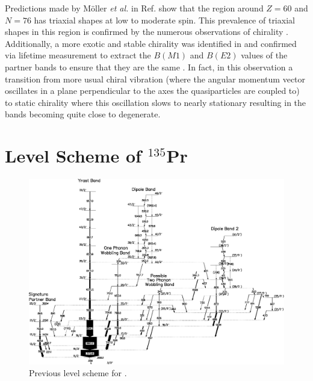 Predictions made by M\"oller \emph{et al.} in Ref. \cite{groundStateTriax} show that the region around $Z=60$ and $N=76$ has triaxial shapes at low to moderate spin. This prevalence of triaxial shapes in this region is confirmed by the numerous observations of chirality \cite{wobblingIn134Pr,chiralityA130Region,chiralityA130Region2,chiralityUpperA130Region,chirality136Pm,chiralityMore135Nd,chiralityMulti133Cs,chiralityMore135Nd}. Additionally, a more exotic and stable chirality was identified in \cite{chiralityMore135Nd} and confirmed via lifetime measurement to extract the $B(M1)$ and $B(E2)$ values of the partner bands to ensure that they are the same \cite{chiralityIn135Nd}. In fact, in this observation a transition from more usual chiral vibration (where the angular momentum vector oscillates in a plane perpendicular to the axes the quasiparticles are coupled to) to static chirality where this oscillation slows to nearly stationary resulting in the bands becoming quite close to degenerate.

\section{Level Scheme of $^{135}$Pr}
\label{sec:trw-lvl-scheme}
\begin{landscape}
\begin{figure}[h!]
\centerline{\includegraphics[height=\textheight]{./img/c4/135Pr_Np_for_diss.eps}}
	\caption{Previous level scheme for \pr{}. \label{fig:chp4-semkow-lvl-schm}}
\end{figure}
\end{landscape}

